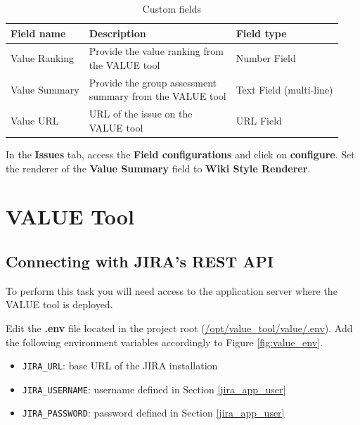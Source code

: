 \documentclass{article}
\begin{document}
\begin{table}[!ht]
    \renewcommand{\arraystretch}{2}
    \centering
    \begin{tabular}{lll}
    \hline
    \textbf{Field name} & \textbf{Description} & \textbf{Field type}\\
    \hline
    Value Ranking & \makecell[l]{Provide the value ranking from\\the VALUE tool} & Number Field\\
    
    Value Summary & \makecell[l]{Provide the group assessment\\summary from the VALUE tool} & Text Field (multi-line)\\
    
    Value URL & \makecell[l]{URL of the issue on the\\VALUE tool} & URL Field\\
    \hline
    \end{tabular}
    \caption{Custom fields}
    \label{tbl:custom_fields}
\end{table}

In the \textbf{Issues} tab, access the \textbf{Field configurations} and click on \textbf{configure}. Set the renderer of the \textbf{Value Summary} field to \textbf{Wiki Style Renderer}.


\section{VALUE Tool}
\label{value}
\subsection{Connecting with JIRA's REST API}
To perform this task you will need access to the application server where the VALUE tool is deployed.

Edit the \textbf{.env} file located in the project root (\url{/opt/value_tool/value/.env}). Add the following environment variables accordingly to Figure \ref{fig:value_env}.

\begin{itemize}
    \item \texttt{JIRA\_URL}: base URL of the JIRA installation
    \item \texttt{JIRA\_USERNAME}: username defined in Section \ref{jira_app_user}
    \item \texttt{JIRA\_PASSWORD}: password defined in Section \ref{jira_app_user}
\end{itemize}
\end{document}
